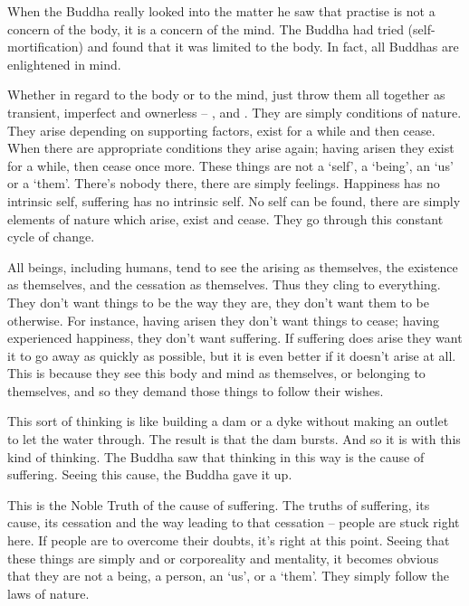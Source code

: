 When the Buddha really looked into the matter he saw that practise is not a concern of the body, it is a concern of the mind. The Buddha had tried  (self-mortification) and found that it was limited to the body. In fact, all Buddhas are enlightened in mind. 

Whether in regard to the body or to the mind, just throw them all together as transient, imperfect and ownerless --  ,   and . They are simply conditions of nature. They arise depending on supporting factors, exist for a while and then cease. When there are appropriate conditions they arise again; having arisen they exist for a while, then cease once more. These things are not a `self', a `being', an `us' or a `them'. There's nobody there, there are simply feelings. Happiness has no intrinsic self, suffering has no intrinsic self. No self can be found, there are simply elements of nature which arise, exist and cease. They go through this constant cycle of change. 

All beings, including humans, tend to see the arising as themselves, the existence as themselves, and the cessation as themselves. Thus they cling to everything. They don't want things to be the way they are, they don't want them to be otherwise. For instance, having arisen they don't want things to cease; having experienced happiness, they don't want suffering. If suffering does arise they want it to go away as quickly as possible, but it is even better if it doesn't arise at all. This is because they see this body and mind as themselves, or belonging to themselves, and so they demand those things to follow their wishes. 

This sort of thinking is like building a dam or a dyke without making an outlet to let the water through. The result is that the dam bursts. And so it is with this kind of thinking. The Buddha saw that thinking in this way is the cause of suffering. Seeing this cause, the Buddha gave it up. 

This is the Noble Truth of the cause of suffering. The truths of suffering, its cause, its cessation and the way leading to that cessation -- people are stuck right here. If people are to overcome their doubts, it's right at this point. Seeing that these things are simply  and  or corporeality and mentality, it becomes obvious that they are not a being, a person, an `us', or a `them'. They simply follow the laws of nature. 

